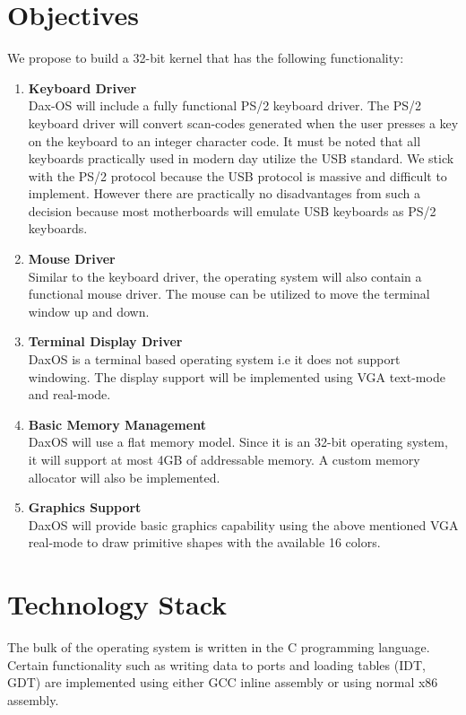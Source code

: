 \section{Objectives}\label{section:Objectives}
We propose to build a 32-bit kernel that has the following functionality:
\begin{enumerate}
	
	\item \textbf{Keyboard Driver} \\
	Dax-OS will include a fully functional PS/2 keyboard driver. The PS/2 keyboard driver will convert scan-codes generated when the user presses a key on the keyboard to an integer character code. It must be noted that all keyboards practically used in modern day utilize the USB standard. We stick with the PS/2 protocol because the USB protocol is massive and difficult to implement. However there are practically no disadvantages from such a decision because most motherboards will emulate USB keyboards as PS/2 keyboards.
	
	\item \textbf{Mouse Driver} \\
	Similar to the keyboard driver, the operating system will also contain a functional mouse driver. The mouse can be utilized to move the terminal window up and down.
	
	\item \textbf{Terminal Display Driver} \\
	DaxOS is a terminal based operating system i.e it does not support windowing.
	The display support will be implemented using VGA text-mode and real-mode.
	
	\item \textbf{Basic Memory Management} \\
	DaxOS will use a flat memory model. Since it is an 32-bit operating system, it will support at most 4GB of addressable memory. A custom memory allocator will also be implemented.

	\item \textbf{Graphics Support} \\
	DaxOS will provide basic graphics capability using the above mentioned VGA real-mode to draw primitive shapes with the available 16 colors. 
\end{enumerate}

\section{Technology Stack} \label{section:Technology Stack}
The bulk of the operating system is written in the C programming language. Certain functionality such as writing data to ports and loading tables (IDT, GDT) are implemented using either GCC inline assembly or using normal x86 assembly. 

